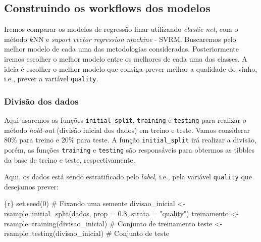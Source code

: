 \documentclass[
  letterpaper,
  DIV=11,
  numbers=noendperiod,
  oneside]{scrartcl}
\newenvironment{Shaded}{\begin{snugshade}}{\end{snugshade}}
\newcommand{\AttributeTok}[1]{\textcolor[rgb]{0.40,0.45,0.13}{#1}}
\newcommand{\CommentTok}[1]{\textcolor[rgb]{0.37,0.37,0.37}{#1}}
\newcommand{\DecValTok}[1]{\textcolor[rgb]{0.68,0.00,0.00}{#1}}
\newcommand{\FloatTok}[1]{\textcolor[rgb]{0.68,0.00,0.00}{#1}}
\newcommand{\FunctionTok}[1]{\textcolor[rgb]{0.28,0.35,0.67}{#1}}
\newcommand{\InformationTok}[1]{\textcolor[rgb]{0.37,0.37,0.37}{#1}}
\newcommand{\NormalTok}[1]{\textcolor[rgb]{0.00,0.23,0.31}{#1}}
\newcommand{\OtherTok}[1]{\textcolor[rgb]{0.00,0.23,0.31}{#1}}
\newcommand{\SpecialCharTok}[1]{\textcolor[rgb]{0.37,0.37,0.37}{#1}}
\newcommand{\StringTok}[1]{\textcolor[rgb]{0.13,0.47,0.30}{#1}}
\begin{document}
\hypertarget{construindo-os-workflows-dos-modelos}{%
\subsection{Construindo os workflows dos
modelos}\label{construindo-os-workflows-dos-modelos}}

Iremos comparar os modelos de regressão linar utilizando \emph{elastic
net}, com o método \(k\)NN e \emph{suport vector regression machine} -
SVRM. Buscaremos pelo melhor modelo de cada uma das metodologias
consideradas. Posteriormente iremos escolher o melhor modelo entre os
melhores de cada uma das classes. A ideia é escolher o melhor modelo que
consiga prever melhor a qualidade do vinho, i.e., prever a variável
\texttt{quality}.

\hypertarget{divisuxe3o-dos-dados}{%
\subsubsection{Divisão dos dados}\label{divisuxe3o-dos-dados}}

Aqui usaremos as funções \texttt{initial\_split}, \texttt{training} e
\texttt{testing} para realizar o método \emph{hold-out} (divisão inicial
dos dados) em treino e teste. Vamos considerar \(80\%\) para treino e
\(20\%\) para teste. A função \texttt{initial\_split} irá realizar a
divisão, porém, as funções \texttt{training} e \texttt{testing} são
responsáveis para obtermos as tibbles da base de treino e teste,
respectivamente.

Aqui, os dados está sendo estratificado pelo \emph{label}, i.e., pela
variável \texttt{quality} que desejamos prever:

\begin{Shaded}
\begin{Highlighting}[]
\InformationTok{\textasciigrave{}\textasciigrave{}\textasciigrave{}\{r\}}
\FunctionTok{set.seed}\NormalTok{(}\DecValTok{0}\NormalTok{) }\CommentTok{\# Fixando uma semente}
\NormalTok{divisao\_inicial }\OtherTok{\textless{}{-}}\NormalTok{ rsample}\SpecialCharTok{::}\FunctionTok{initial\_split}\NormalTok{(dados, }\AttributeTok{prop =} \FloatTok{0.8}\NormalTok{, }\AttributeTok{strata =} \StringTok{"quality"}\NormalTok{)}
\NormalTok{treinamento }\OtherTok{\textless{}{-}}\NormalTok{ rsample}\SpecialCharTok{::}\FunctionTok{training}\NormalTok{(divisao\_inicial) }\CommentTok{\# Conjunto de treinamento}
\NormalTok{teste }\OtherTok{\textless{}{-}}\NormalTok{ rsample}\SpecialCharTok{::}\FunctionTok{testing}\NormalTok{(divisao\_inicial) }\CommentTok{\# Conjunto de teste}
\InformationTok{\textasciigrave{}\textasciigrave{}\textasciigrave{}}
\end{Highlighting}
\end{Shaded}
\end{document}
